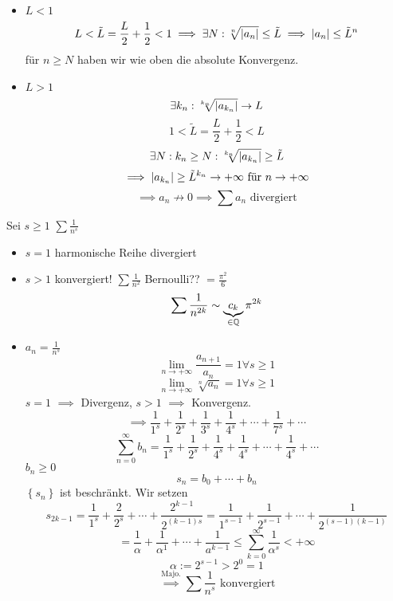 \begin{Bew}
  \begin{itemize}
    \item $L<1$ 
      \[L<\tilde L=\frac{L}{2}+\frac{1}{2}<1 \implies \exists N: \sqrt[n]{\mathopen| a_n \mathclose|}\leq\tilde L\implies\mathopen| a_n \mathclose|\leq\tilde{L}^n\]
      für $n\geq N$ haben wir wie oben die absolute Konvergenz.
    \item $L>1$
      \[\exists k_n: \sqrt[k_n]{\mathopen| a_{k_n} \mathclose|}\to L\]
      \[1<\tilde{L}=\frac{L}{2}+\frac{1}{2}<L\]
      \[\exists N: k_n\geq N: \sqrt[k_n]{\mathopen| a_{k_n} \mathclose|}\geq \tilde L\]
      \[\implies \mathopen| a_{k_n} \mathclose|\geq \tilde{L}^{k_n}\to+\infty\text{ für } n\to+\infty\]
      \[\implies a_n\not\to 0\implies \sum a_n\text{ divergiert}\]
  \end{itemize}
\end{Bew}
\begin{Bsp}
  Sei $s\geq 1$ $\sum\frac{1}{n^s}$
  \begin{itemize}
    \item $s=1$ harmonische Reihe divergiert
    \item $s>1$ konvergiert! $\sum\frac{1}{n^2}$ Bernoulli?? $=\frac{\pi^2}{6}$
      \[\sum\frac{1}{n^{2k}}\sim \underbrace{c_k}_{\in\mathbb{Q}}\pi^{2k}\]
    \item $a_n=\frac{1}{n^s}$
      \[\lim_{n\to+\infty}\frac{a_{n+1}}{a_n}=1\forall s\geq 1\]
      \[\lim_{n\to+\infty}\sqrt[n]{a_n}=1\forall s\geq 1\]
      $s=1$ $\implies$ Divergenz, $s>1$ $\implies$ Konvergenz.
      \[\implies \frac{1}{1^s}+\frac{1}{2^s}+\frac{1}{3^s}+\frac{1}{4^s}+\cdots+\frac{1}{7^s}+\cdots\]
      \[\sum^\infty_{n=0} b_n= \frac{1}{1^s}+\frac{1}{2^s}+\frac{1}{4^s}+\frac{1}{4^s}+\cdots+\frac{1}{4^s}+\cdots\]
      $b_n\geq 0$
      \[s_n=b_0+\cdots+b_n\]
      $\left\{ s_n \right\}$ ist beschränkt. Wir setzen 
      \[s_{2k-1}=\frac{1}{1^s}+\frac{2}{2^s}+\cdots+\frac{2^{k-1}}{2^{(k-1)s}}=\frac{1}{1^{s-1}}+\frac{1}{2^{s-1}}+\cdots+\frac{1}{2^{(s-1)(k-1)}}\]
      \[=\frac{1}{\alpha}+\frac{1}{\alpha^1}+\cdots+\frac{1}{a^{k-1}}\leq\sum^\infty_{k=0}\frac{1}{\alpha^s}<+\infty\]
      \[\alpha:=2^{s-1}>2^0=1\]
      \[\stackrel{\text{Majo.}}{\implies}\sum \frac{1}{n^s}\text{ konvergiert}\]
  \end{itemize}
\end{Bsp}

